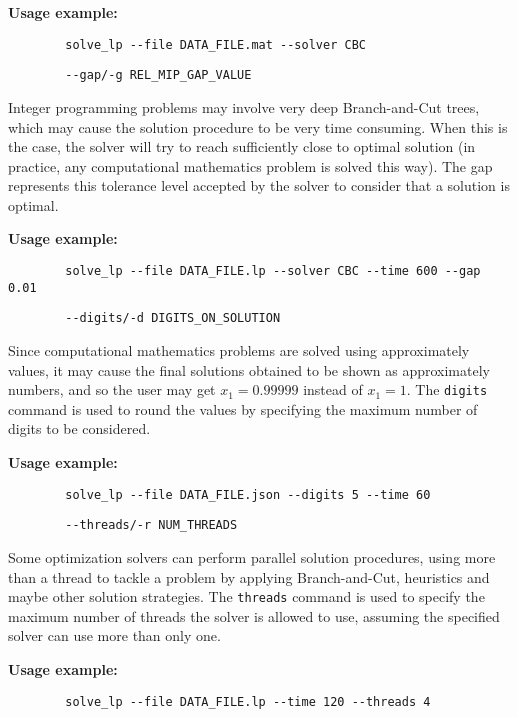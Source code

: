 \documentclass[12pt,hidelinks]{article}
\begin{document}
	\textbf{Usage example:} 
	\begin{verbatim}
		solve_lp --file DATA_FILE.mat --solver CBC
	\end{verbatim}

	{\color{mordantred19}
	\begin{verbatim}
		--gap/-g REL_MIP_GAP_VALUE
	\end{verbatim}
	} Integer programming problems may involve very deep Branch-and-Cut trees, which may cause the solution procedure to be very time consuming. When this is the case, the solver will try to reach sufficiently close to optimal solution (in practice, any computational mathematics problem is solved this way). The gap represents this tolerance level accepted by the solver to consider that a solution is optimal.
	
	\textbf{Usage example:} 
	\begin{verbatim}
		solve_lp --file DATA_FILE.lp --solver CBC --time 600 --gap 0.01
	\end{verbatim}

	{\color{mordantred19}
	\begin{verbatim}
		--digits/-d DIGITS_ON_SOLUTION
	\end{verbatim}
	} Since computational mathematics problems are solved using approximately values, it may cause the final solutions obtained to be shown as approximately numbers, and so the user may get $x_1 = 0.99999$ instead of $x_1 = 1$. The \texttt{digits} command is used to round the values by specifying the maximum number of digits to be considered.
	
	\textbf{Usage example:} 
	\begin{verbatim}
		solve_lp --file DATA_FILE.json --digits 5 --time 60
	\end{verbatim}

	{\color{mordantred19}
	\begin{verbatim}
		--threads/-r NUM_THREADS
	\end{verbatim}
	} Some optimization solvers can perform parallel solution procedures, using more than a thread to tackle a problem by applying Branch-and-Cut, heuristics and maybe other solution strategies. The \texttt{threads} command is used to specify the maximum number of threads the solver is allowed to use, assuming the specified solver can use more than only one.
	
	\textbf{Usage example:} 
	\begin{verbatim}
		solve_lp --file DATA_FILE.lp --time 120 --threads 4
	\end{verbatim}
\end{document}
